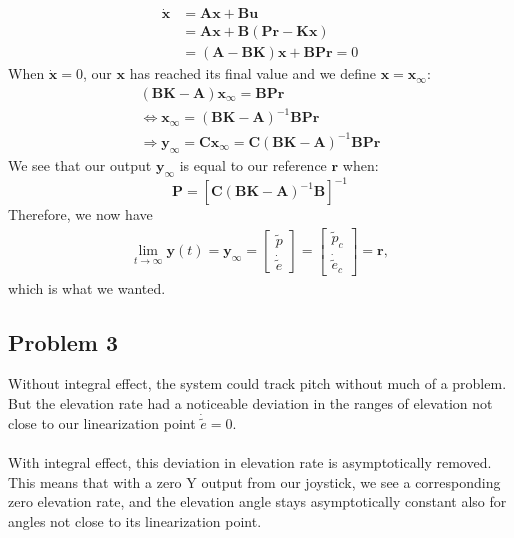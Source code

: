 \begin{align*}
  \dot{\boldsymbol{x}} &= \boldsymbol{Ax} + \boldsymbol{Bu} \\
                       &= \boldsymbol{Ax} +
                         \boldsymbol{B}(\boldsymbol{Pr} -
                         \boldsymbol{Kx}) \\
											 &= (\boldsymbol{A}-\boldsymbol{BK})\boldsymbol{x}
												+ \boldsymbol{BPr} = 0
\end{align*}
When $\boldsymbol{\dot{x}} = 0$, our $\boldsymbol{x}$ has reached its final value and we define $\boldsymbol{x} = \boldsymbol{x_\infty}$:
\begin{align*}
(\boldsymbol{BK} - \boldsymbol{A})\boldsymbol{x_\infty} = \boldsymbol{BPr} \\
\Leftrightarrow \boldsymbol{x_\infty} = (\boldsymbol{BK} - \boldsymbol{A})^{-1}\boldsymbol{BPr} \\
\Rightarrow \boldsymbol{y_\infty} = \boldsymbol{Cx_\infty} = \boldsymbol{C}(\boldsymbol{BK} - \boldsymbol{A})^{-1}\boldsymbol{BPr}
\end{align*}
We see that our output $\boldsymbol{y_\infty}$ is equal to our reference $\boldsymbol{r}$ when:
\begin{equation}
\boldsymbol{P} = [\boldsymbol{C}(\boldsymbol{BK} - \boldsymbol{A})^{-1}\boldsymbol{B}]^{-1}
\end{equation}
Therefore, we now have
\begin{align*}
\lim_{t\to\infty}\boldsymbol{y}(t) = \boldsymbol{y_\infty} =
\begin{bmatrix}
\tilde{p} \\
\dot{\tilde{e}}
\end{bmatrix}
= 
\begin{bmatrix}
\tilde{p}_c \\
\dot{\tilde{e}}_c
\end{bmatrix}
= \boldsymbol{r},
\end{align*}
which is what we wanted.
\subsection{Problem 3}
Without integral effect, the system could track pitch without much of a problem. But the elevation rate had a noticeable deviation in the ranges of elevation not close to our linearization point $\dot{\tilde{e}} = 0$. %
\\
\\
With integral effect, this deviation in elevation rate is asymptotically removed. This means that with a zero Y output from our joystick, we see a corresponding zero elevation rate, and the elevation angle stays asymptotically constant also for angles not close to its linearization point.

